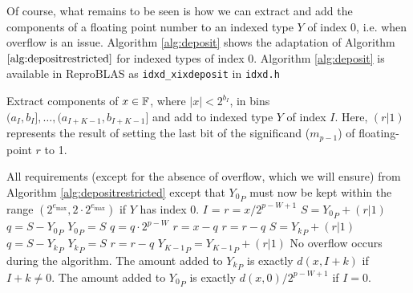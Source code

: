       Of course, what remains to be seen is how we can extract and add the
      components of a floating point number to an indexed type $Y$ of index 0,
      i.e. when overflow is an issue. Algorithm \ref{alg:deposit} shows the
      adaptation of Algorithm $\ref{alg:depositrestricted}$ for indexed types
      of index 0. Algorithm \ref{alg:deposit} is available in ReproBLAS as \texttt{idxd_xixdeposit} in \texttt{idxd.h}

      \begin{samepage}
      \begin{alg}
        Extract components of $x \in \mathbb{F}$, where $|x| < 2^{b_I}$,
        in bins $(a_I,b_I], \ldots, (a_{I + K - 1}, b_{I + K - 1}]$
        and add to indexed type $Y$ of index $I$. Here, $(r | 1)$ represents
        the result of setting the last bit of the significand ($m_{p - 1}$) of
        floating-point $r$ to 1.
        \begin{algorithmic}[1]
          \Require
            \Statex All requirements (except for the absence of overflow, which we will ensure)
            from Algorithm \ref{alg:depositrestricted} except that ${Y_0}_P$
            must now be kept within the range $(2^{e_{\max}}, 2 \cdot 2^{e_{\max}})$ if $Y$ has index 0.
            \State $I$ = 
              \State $r = x / 2^{p - W + 1}$ \label{alg:deposit:scaler}
              \State $S = {Y_0}_P + (r | 1)$ \label{alg:deposit:formS}
              \State $q = S - {Y_0}_P$ \label{alg:deposit:formq}
              \State ${Y_0}_P = S$
              \State $q = q \cdot 2^{p - W}$ \label{alg:deposit:scaleq}
              \State $r = x - q$ \label{alg:deposit:formr}
              \State $r = r - q$ \label{alg:deposit:formragain}
                \State $S = {Y_k}_P + (r | 1)$
                \State $q = S - {Y_k}_P$
                \State ${Y_k}_P = S$
                \State $r = r - q$
              \EndFor
              \State ${Y_{K - 1}}_P = {Y_{K - 1}}_P + (r | 1)$
            \Else
              \State{} \label{alg:deposit:callrestricted}
            \EndIf
          \EndFunction
          \Ensure
            \Statex No overflow occurs during the algorithm.
            \Statex The amount added to ${Y_k}_P$ is exactly $d(x, I + k)$ if $I + k \neq 0$.
            \Statex The amount added to ${Y_0}_P$ is exactly $d(x, 0)/2^{p - W + 1}$ if $I = 0$.
        \end{algorithmic}
        \label{alg:deposit}
      \end{alg}
      \end{samepage}

